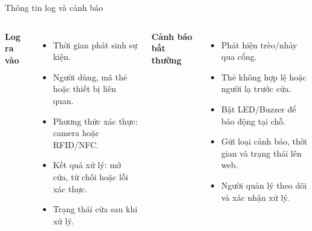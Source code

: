 \documentclass[aspectratio=169]{beamer}
\begin{document}
\begin{frame}{Thông tin log và cảnh báo}
  \begin{columns}[T]
      \textbf{Log ra vào}
      \begin{itemize}
        \item Thời gian phát sinh sự kiện.
        \item Người dùng, mã thẻ hoặc thiết bị liên quan.
        \item Phương thức xác thực: camera hoặc RFID/NFC.
        \item Kết quả xử lý: mở cửa, từ chối hoặc lỗi xác thực.
        \item Trạng thái cửa sau khi xử lý.
      \end{itemize}

      \textbf{Cảnh báo bất thường}
      \begin{itemize}
        \item Phát hiện trèo/nhảy qua cổng.
        \item Thẻ không hợp lệ hoặc người lạ trước cửa.
        \item Bật LED/Buzzer để báo động tại chỗ.
        \item Gửi loại cảnh báo, thời gian và trạng thái lên web.
        \item Người quản lý theo dõi và xác nhận xử lý.
      \end{itemize}
  \end{columns}
\end{frame}
\end{document}
